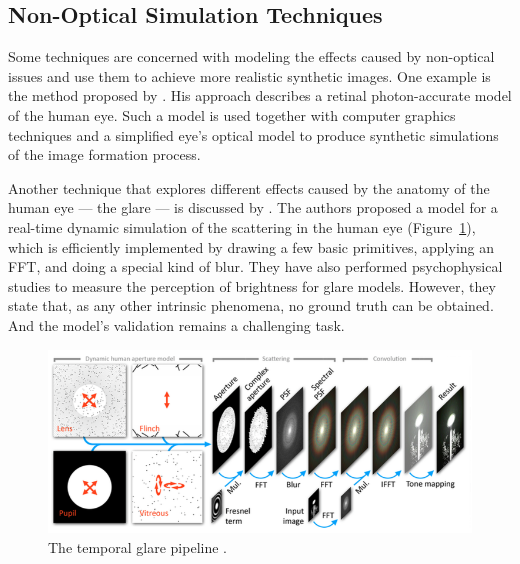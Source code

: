 
\subsection{Non-Optical Simulation Techniques}
\label{subsec:NonOpticalSimulationTechniques}

Some techniques are concerned with modeling the effects caused by non-optical issues and use them to achieve more realistic synthetic images. One example is the method proposed by \citet{Deering2005}. His approach describes a retinal photon-accurate model of the human eye. Such a model is used together with computer graphics techniques and a simplified eye's optical model to produce synthetic simulations of the image formation process. 

Another technique that explores different effects caused by the anatomy of the human eye --- the glare --- is discussed by \citet{Ritschel2009}. The authors proposed a model for a real-time dynamic simulation of the scattering in the human eye (Figure~\ref{fig:ritschel_pipeline}), which is efficiently implemented by drawing a few basic primitives, applying an FFT, and doing a special kind of blur. They have also performed psychophysical studies to measure the perception of brightness for glare models. However, they state that, as any other intrinsic phenomena, no ground truth can be obtained. And the model's validation remains a challenging task.

\begin{figure}[h]
	\centering
	\includegraphics[width=0.99\linewidth]{__Images/03/ritschel_pipeline.png}
	\caption[The temporal glare pipeline]{The temporal glare pipeline \cite{Ritschel2009}.}
	\label{fig:ritschel_pipeline}
\end{figure}